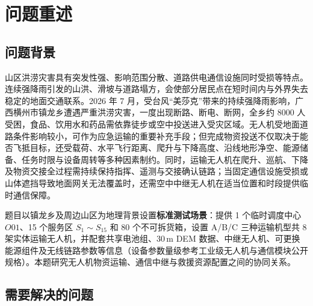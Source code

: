 \section{问题重述}

\subsection{问题背景}

山区洪涝灾害具有突发性强、影响范围分散、道路供电通信设施同时受损等特点。连续强降雨引发的山洪、滑坡与道路塌方，会使部分居民点在短时间内与外界失去稳定的地面交通联系。2026 年 7 月，受台风“美莎克”带来的持续强降雨影响，广西横州市镇龙乡遭遇严重洪涝灾害，一度出现断路、断电、断网，全乡约 8000 人受困\cite{ref_xinhua1,ref_xinhua2}，食品、饮用水和药品需依靠徒步或空中投送进入受灾区域。无人机受地面道路条件影响较小，可作为应急运输的重要补充手段；但完成物资投送不仅取决于能否飞抵目标，还受载荷、水平飞行距离、爬升与下降高度、沿线地形净空、能源储备、任务时限与设备周转等多种因素制约。同时，运输无人机在爬升、巡航、下降及物资交接全过程需持续保持指挥、遥测与交接确认链路；当固定通信设施受损或山体遮挡导致地面网关无法覆盖时，还需空中中继无人机在适当位置和时段提供临时通信保障。

题目以镇龙乡及周边山区为地理背景设置\textbf{标准测试场景}：提供 1 个临时调度中心 $O01$、15 个服务区 $S_1\!\sim\!S_{15}$ 和 80 个不可拆货箱，设置 A/B/C 三种运输机型共 8 架实体运输无人机，并配套共享电池组、30\,m DEM 数据、中继无人机、可更换能源组件及无线链路参数等信息（设备参数量级参考工业级无人机与通信模块公开规格\cite{ref_dji,ref_doodle}）。本题研究无人机物资运输、通信中继与救援资源配置之间的协同关系。

\subsection{需要解决的问题}

